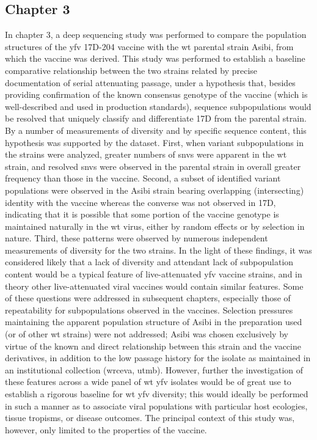 \subsection{Chapter 3}
In chapter 3, a deep sequencing study was performed to compare the population structures of the \gls{yfv} 17D-204 vaccine with the \gls{wt} parental strain Asibi, from which the vaccine was derived. This study was performed to establish a baseline comparative relationship between the two strains related by precise documentation of serial attenuating passage, under a hypothesis that, besides providing confirmation of the known consensus genotype of the vaccine (which is well-described and used in production standards), sequence subpopulations would be resolved that uniquely classify and differentiate 17D from the parental strain.  By a number of measurements of diversity and by specific sequence content, this hypothesis was supported by the dataset. First, when variant subpopulations in the strains were analyzed, greater numbers of \glspl{snv} were apparent in the \gls{wt} strain, and resolved \glspl{snv} were observed in the parental strain in overall greater frequency than those in the vaccine. Second, a subset of identified variant populations were observed in the Asibi strain bearing overlapping (intersecting) identity with the vaccine whereas the converse was not observed in 17D, indicating that it is possible that some portion of the vaccine genotype is maintained naturally in the \gls{wt} virus, either by random effects or by selection in nature. Third, these patterns were observed by numerous independent measurements of diversity for the two strains. In the light of these findings, it was considered likely that a lack of diversity and attendant lack of subpopulation content would be a typical feature of live-attenuated \gls{yfv} vaccine strains, and in theory other live-attenuated viral vaccines would contain similar features. Some of these questions were addressed in subsequent chapters, especially those of repeatability for subpopulations observed in the vaccines. Selection pressures maintaining the apparent population structure of Asibi in the preparation used (or of other \gls{wt} strains) were not addressed; Asibi was chosen exclusively by virtue of the known and direct relationship between this strain and the vaccine derivatives, in addition to the low passage history for the isolate as maintained in an institutional collection (\gls{wrceva}, \gls{utmb}). However, further the investigation of these features across a wide panel of \gls{wt} \gls{yfv} isolates would be of great use to establish a rigorous baseline for \gls{wt} \gls{yfv} diversity; this would ideally be performed in such a manner as to associate viral populations with particular host ecologies, tissue tropisms, or disease outcomes. The principal context of this study was, however, only limited to the properties of the vaccine.

